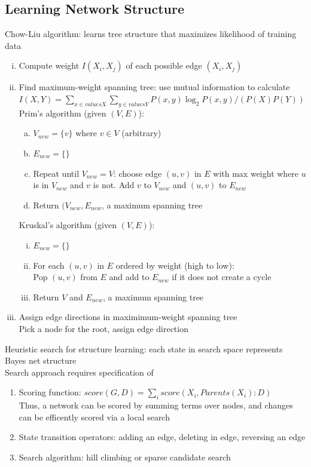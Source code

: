 \documentclass{article}
\begin{document}
		\subsection{Learning Network Structure}
			Chow-Liu algorithm: learns tree structure that maximizes likelihood of training data
			\begin{enumerate}[(i)]
				\item Compute weight $I(X_i, X_j)$ of each possible edge $(X_i, X_j)$
				\item Find maximum-weight spanning tree: use mutual information to calculate \\
				$I(X, Y) = \sum_{x \in values{X}}\sum_{y \in values{Y}} P(x, y)\log_2 P(x, y)/(P(X)P(Y))$ \\
				Prim's algorithm (given $(V, E)$):
				\begin{enumerate}[(a)]
					\item $V_{new} = \{v\}$ where $v \in V$ (arbitrary)
					\item $E_{new} = \{\}$
					\item Repeat until $V_{new} = V$: choose edge $(u, v)$ in $E$ with max weight where $u$ is in $V_{new}$ and $v$ is not. Add $v$ to $V_{new}$ and $(u, v)$ to $E_{new}$
					\item Return $(V_{new}, E_{new}$, a maximum spanning tree
					\end{enumerate}
				Kruskal's algorithm (given $(V, E)$):
				\begin{enumerate}[(i)]
					\item $E_{new} = \{\}$
					\item For each $(u, v)$ in $E$ ordered by weight (high to low): \\
					Pop $(u, v)$ from $E$ and add to $E_{new}$ if it does not create a cycle
					\item Return $V$ and $E_{new}$, a maximum spanning tree
					\end{enumerate}
				\item Assign edge directions in maximimum-weight spanning tree \\
				Pick a node for the root, assign edge direction
				\end{enumerate}
			Heuristic search for structure learning: each state in search space represents Bayes net structure \\
			Search approach requires specification of
			\begin{enumerate}
				\item Scoring function: $score(G, D) = \sum_i score(X_i, Parents(X_i):D)$ \\
				Thus, a network can be scored by summing terms over nodes, and changes can be efficently scored via a local search
				\item State transition operators: adding an edge, deleting in edge, reversing an edge
				\item Search algorithm: hill climbing or sparse candidate search
				\end{enumerate}
\end{document}
